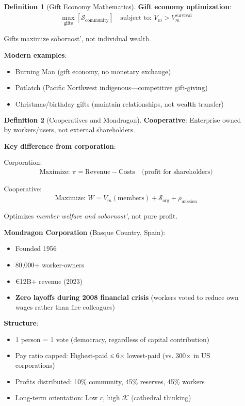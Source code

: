 \documentclass[11pt,a4paper]{article}
\theoremstyle{definition}
\newtheorem{definition}{Definition}[section]
\theoremstyle{remark}
\begin{document}
\begin{small}
\begin{enumerate}
\begin{definition}[Gift Economy Mathematics]
\textbf{Gift economy optimization}:
\begin{align}
\max_{\text{gifts}} \left[ \mathcal{S}_{\text{community}} \right] \quad \text{subject to: } V_m > V_m^{\text{survival}}
\end{align}

Gifts maximize sobornost', not individual wealth.

\textbf{Modern examples}:
\begin{itemize}
    \item Burning Man (gift economy, no monetary exchange)
    \item Potlatch (Pacific Northwest indigenous—competitive gift-giving)
    \item Christmas/birthday gifts (maintain relationships, not wealth transfer)
\end{itemize}
\end{definition}

\begin{definition}[Cooperatives and Mondragon]
\textbf{Cooperative}: Enterprise owned by workers/users, not external shareholders.

\textbf{Key difference from corporation}:

Corporation:
\begin{align}
\text{Maximize: } \pi = \text{Revenue} - \text{Costs} \quad \text{(profit for shareholders)}
\end{align}

Cooperative:
\begin{align}
\text{Maximize: } W = V_m(\text{members}) + \mathcal{S}_{\text{org}} + \rho_{\text{mission}}
\end{align}

Optimizes \textit{member welfare and sobornost'}, not pure profit.

\textbf{Mondragon Corporation} (Basque Country, Spain):
\begin{itemize}
    \item Founded 1956
    \item 80,000+ worker-owners
    \item €12B+ revenue (2023)
    \item \textbf{Zero layoffs during 2008 financial crisis} (workers voted to reduce own wages rather than fire colleagues)
\end{itemize}

\textbf{Structure}:
\begin{itemize}
    \item 1 person = 1 vote (democracy, regardless of capital contribution)
    \item Pay ratio capped: Highest-paid ≤ 6× lowest-paid (vs. 300× in US corporations)
    \item Profits distributed: 10\% community, 45\% reserves, 45\% workers
    \item Long-term orientation: Low \(r\), high \(\mathcal{K}\) (cathedral thinking)
\end{itemize}


\end{definition}
\end{enumerate}
\end{small}
\end{document}
